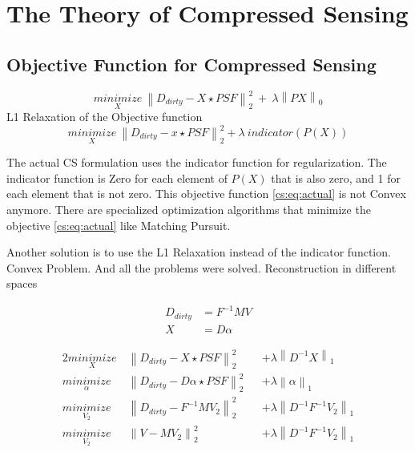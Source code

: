 \section{The Theory of Compressed Sensing} \label{cs}





\subsection{Objective Function for Compressed Sensing}
\begin{equation}\label{intro:eq:csclean}
\underset{X}{minimize} \: \left \| D_{dirty} - X \star PSF \right \|_2^2 \: + \: \lambda \left \| PX \right \|_0
\end{equation}
L1 Relaxation of the Objective function
\begin{equation} \label{cs:eq:actual}
\underset{X}{minimize} \: \left \| D_{dirty} - x \star PSF \right \|_2^2 + \lambda \: indicator(P(X))
\end{equation}

The actual CS formulation uses the indicator function for regularization. The indicator function is Zero for each element of $P(X)$ that is also zero, and 1 for each element that is not zero. This objective function \eqref{cs:eq:actual} is not Convex anymore. There are specialized optimization algorithms that minimize the objective \eqref{cs:eq:actual} like Matching Pursuit. 

Another solution is to use the L1 Relaxation instead of the indicator function. Convex Problem. And all the problems were solved.
Reconstruction in different spaces


\begin{equation}
\begin{split}
D_{dirty} &= F^{-1}MV \\
X &= D\alpha
\end{split}
\end{equation}

\begin{alignat*}{2}
	\underset{X}{minimize} \:& \left \| D_{dirty} - X \star PSF \right \|_2^2 &&+  \lambda \left \| D^{-1}X \right \|_1 \\
	\underset{\alpha}{minimize} \:& \left \| D_{dirty} - D\alpha \star PSF \right \|_2^2 &&+ \lambda \left \| \alpha \right \|_1 \\
	\underset{V_2}{minimize} \:& \left \| D_{dirty} - F^{-1} M V_2 \right \|_2^2 &&+ \lambda \left \| D^{-1}F^{-1}V_2\right \|_1 \\
	\underset{V_2}{minimize} \:& \left \| V - M V_2 \right \|_2^2 &&+ \lambda \left \| D^{-1}F^{-1}V_2\right \|_1
\end{alignat*}

